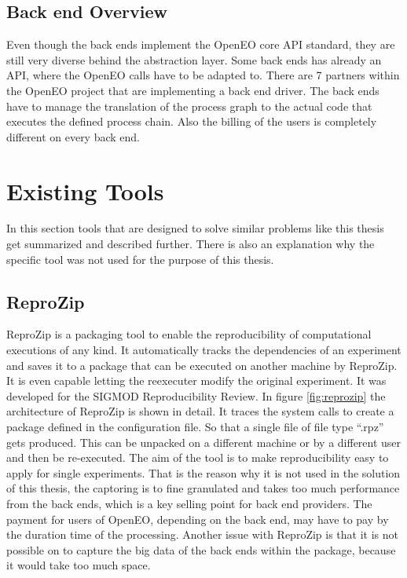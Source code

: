 \documentclass[draft,final]{vutinfth} %
\begin{document}
\subsection{Back end Overview}\label{Back end Overview}
Even though the back ends implement the OpenEO core API standard, they are still very diverse behind the abstraction layer. Some back ends has already an API, where the OpenEO calls have to be adapted to. There are 7 partners within the OpenEO project that are implementing a back end driver. The back ends have to manage the translation of the process graph to the actual code that executes the defined process chain. Also the billing of the users is completely different on every back end. 

\section{Existing Tools}\label{Existing Tools}
In this section tools that are designed to solve similar problems like this thesis get summarized and described further. There is also an explanation why the specific tool was not used for the purpose of this thesis. 

\subsection{ReproZip}\label{ReproZip}
ReproZip is a packaging tool to enable the reproducibility of computational executions of any kind. It automatically tracks the dependencies of an experiment and saves it to a package that can be executed on another machine by ReproZip. It is even capable letting the reexecuter modify the original experiment. It was developed for the SIGMOD Reproducibility Review. In figure \ref{fig:reprozip} the architecture of ReproZip is shown in detail. It traces the system calls to create a package defined in the configuration file. So that a single file of file type “.rpz” gets produced. This can be unpacked on a different machine or by a different user and then be re-executed. The aim of the tool is to make reproducibility easy to apply for single experiments. \cite{29c5846926a4497d95f276604cb0368c} That is the reason why it is not used in the solution of this thesis, the captoring  is to fine granulated and takes too much performance from the back ends, which is a key selling point for back end providers. The payment for users of OpenEO, depending on the back end, may have to pay by the duration time of the processing. Another issue with ReproZip is that it is not possible on to capture the big data of the back ends within the package, because it would take too much space.  
\end{document}
